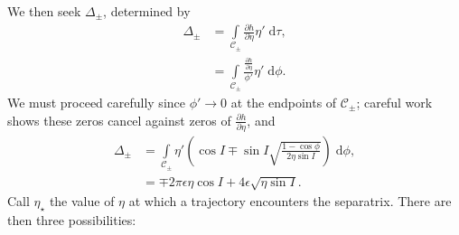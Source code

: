 \documentclass[
        fleqn,
        usenatbib,
    ]{mnras}
\newcommand*{\pd}[2]{\frac{\partial#1}{\partial#2}}
\newcommand*{\p}[1]{\left(#1\right)}
\begin{document}
We then seek $\Delta_{\pm}$, determined by
\begin{align}
    \Delta_{\pm} &= \int\limits_{\mathcal{C}_{\pm}}
            \pd{h}{\eta}\eta'\;\mathrm{d}\tau,\nonumber\\
        &= \int\limits_{\mathcal{C}_{\pm}}
            \frac{\pd{h}{\eta}}{\phi'}\eta'\;\mathrm{d}\phi.
\end{align}
We must proceed carefully since $\phi' \to 0$ at the endpoints of
$\mathcal{C}_{\pm}$; careful work shows these zeros cancel against zeros of
$\pd{h}{\eta}$, and
\begin{align}
    \Delta_{\pm} &= \int\limits_{\mathcal{C}_{\pm}} \eta'
        \p{\cos I \mp \sin I \sqrt{\frac{1 - \cos \phi}{2\eta\sin I}}}
            \;\mathrm{d}\phi,\label{eq:p1_delta_eq}\\
        &= \mp 2\pi \epsilon \eta \cos I
            + 4\epsilon\sqrt{\eta \sin I}.\label{eq:p1_delta}
\end{align}
Call $\eta_\star$ the value of $\eta$ at which a trajectory encounters the
separatrix. There are then three possibilities:
\end{document}
